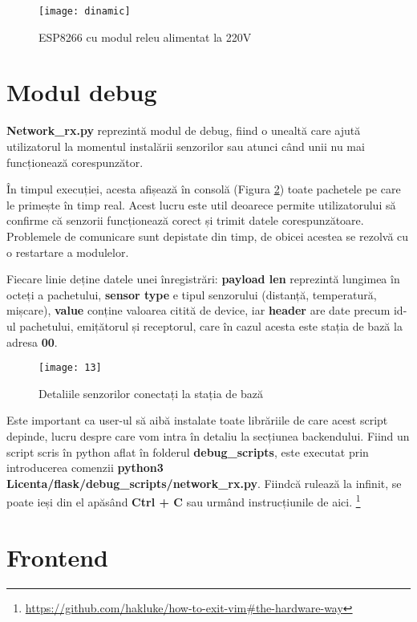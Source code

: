 \begin{figure}[h]
	\centering
	\texttt{[image: dinamic]}
	\caption{ESP8266 cu modul releu alimentat la 220V}
	\label{fig:dinamic}
\end{figure}

\section{Modul debug}

\textbf{Network\_rx.py} reprezintă modul de debug, fiind o unealtă care ajută utilizatorul la momentul instalării senzorilor sau atunci când unii nu mai funcționează corespunzător.

În timpul execuției, acesta afișează în consolă (Figura \ref{fig:13}) toate pachetele pe care le primește în timp real. Acest lucru este util deoarece permite utilizatorului să confirme că senzorii funcționează corect și trimit datele corespunzătoare. Problemele de comunicare sunt depistate din timp, de obicei acestea se rezolvă cu o restartare a modulelor.

Fiecare linie deține datele unei înregistrări: \textbf{payload len} reprezintă lungimea în octeți a pachetului, \textbf{sensor type} e tipul senzorului (distanță, temperatură, mișcare), \textbf{value} conține valoarea citită de device, iar \textbf{header} are date precum id-ul pachetului, emițătorul și receptorul, care în cazul acesta este stația de bază la adresa \textbf{00}.

\begin{figure}[h]
	\centering
	\texttt{[image: 13]}
	\caption{Detaliile senzorilor conectați la stația de bază}
	\label{fig:13}
\end{figure}

Este important ca user-ul să aibă instalate toate librăriile de care acest script depinde, lucru despre care vom intra în detaliu la secțiunea backendului. Fiind un script scris în python aflat în folderul \textbf{debug\_scripts}, este executat prin introducerea comenzii \textbf{python3 Licenta/flask/debug\_scripts/network\_rx.py}. Fiindcă rulează la infinit, se poate ieși din el apăsând \textbf{Ctrl + C} sau urmând instrucțiunile de aici. \footnote{\url{https://github.com/hakluke/how-to-exit-vim\#the-hardware-way}}

\newpage

\section{Frontend}

